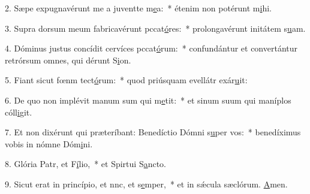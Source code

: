 2. Sæpe expugnavérunt me a juventte m\uline{e}a:~* étenim non potérunt m\uline{i}hi.\par 
3. Supra dorsum meum fabricavérunt pccat\uline{ó}res:~* prolongavérunt initátem s\uline{u}am.\par 
4. Dóminus justus concídit cervíces pccat\uline{ó}rum:~* confundántur et convertántur retrórsum omnes, qui dérunt S\uline{i}on.\par 
5. Fiant sicut fœnm tect\uline{ó}rum:~* quod priúsquam evellátr exár\uline{u}it:\par 
6. De quo non implévit manum sum qui m\uline{e}tit:~* et sinum suum qui maníplos cóll\uline{i}git.\par 
7. Et non dixérunt qui præteríbant: Benedíctio Dómni s\uline{u}per vos:~* benedíximus vobis in nómne Dóm\uline{i}ni.\par 
8. Glória Patr, et F\uline{í}lio,~* et Spirtui S\uline{a}ncto.\par 
9. Sicut erat in princípio, et nnc, et s\uline{e}mper,~* et in sǽcula sæclórum. \uline{A}men.\par 
